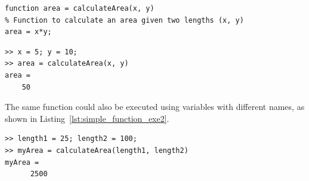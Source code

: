 \begin{lstlisting}[caption={A simple function},label=lst:simple_function]
function area = calculateArea(x, y)
% Function to calculate an area given two lengths (x, y)
area = x*y;
\end{lstlisting}

\begin{lstlisting}[caption={Execution of a simple function},label=lst:simple_function_exe1]
>> x = 5; y = 10;
>> area = calculateArea(x, y)
area = 
    50
\end{lstlisting}

The same function could also be executed using variables with different names, as shown in Listing~\ref{lst:simple_function_exe2}.
\begin{lstlisting}[caption={Execution of a simple function},label=lst:simple_function_exe2]
>> length1 = 25; length2 = 100;
>> myArea = calculateArea(length1, length2)
myArea = 
      2500
\end{lstlisting}
\vspace{5mm}

\addtolength{\parindent}{-4mm}
\\
\addtolength{\parindent}{4mm}

